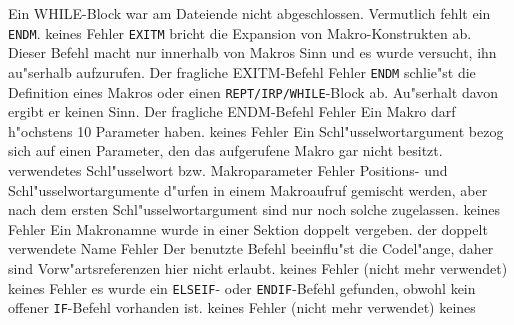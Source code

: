 \documentclass[12pt,a4paper,twoside]{report}
\newcommand{\tty}[1]{{\tt #1}}
\begin{document}
\begin{description}
               {Ein WHILE-Block war am Dateiende nicht
                abgeschlossen.  Vermutlich fehlt ein \tty{ENDM}.}
               {keines}
               {Fehler}
               {\tty{EXITM} bricht die Expansion von
                Makro-Konstrukten ab.  Dieser Befehl macht nur innerhalb
                von Makros Sinn und es wurde versucht, ihn au"serhalb
                aufzurufen.}
               {Der fragliche EXITM-Befehl}
               {Fehler}
               {\tty{ENDM} schlie"st die Definition eines Makros oder einen
                \tty{REPT/IRP/WHILE}-Block ab.  Au"serhalt davon ergibt
                er keinen Sinn.}
               {Der fragliche ENDM-Befehl}
               {Fehler}
               {Ein Makro darf h"ochstens 10 Parameter haben.}
               {keines}
               {Fehler}
               {Ein Schl"usselwortargument bezog sich auf einen
                Parameter, den das aufgerufene Makro gar nicht
                besitzt.}
               {verwendetes Schl"usselwort bzw. Makroparameter}
               {Fehler}
               {Positions- und Schl"usselwortargumente d"urfen in
                einem Makroaufruf gemischt werden, aber nach dem
                ersten Schl"usselwortargument sind nur noch
                solche zugelassen.}
               {keines}
               {Fehler}
               {Ein Makronamne wurde in einer Sektion doppelt
                vergeben.}
               {der doppelt verwendete Name}
               {Fehler}
               {Der benutzte Befehl beeinflu"st die Codel"ange,
                daher sind Vorw"artsreferenzen hier nicht erlaubt.}
               {keines}
               {Fehler}
               {(nicht mehr verwendet)}
               {keines}
               {Fehler}
               {es wurde ein \tty{ELSEIF}- oder \tty{ENDIF}-Befehl gefunden,
                obwohl kein offener \tty{IF}-Befehl vorhanden ist.}
               {keines}
               {Fehler}
               {(nicht mehr verwendet)}
               {keines}

\end{description}
\end{document}
